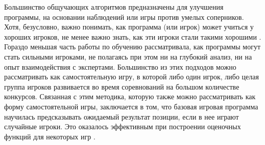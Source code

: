 Большинство общучающих алгоритмов предназначены для улучшения программы,
на основании наблюдений или игры против умелых соперников. Хотя,
безусловно, важно понимать, как программа (или игрок) может учиться у
хороших игроков, не менее важно знать, как эти игроки стали такими
хорошими . Гораздо меньшая часть работы по обучению рассматривала, как
программы могут стать сильными игроками, не полагаясь при этом ни на
глубокий анализ, ни на опыт взаимодействия с экспертами. Большинство из
этих подходов можно рассматривать как самостоятельную игру, в которой
либо один игрок, либо целая группа игроков развивается во время
соревнований на большом количестве конкурсов. Связанная с этим методика,
которую также можно рассматривать как форму самостоятельной игры,
заключается в том, что базовая игровая программа научилась предсказывать
ожидаемый результат позиции, если в нее играют случайные игроки. Это
оказалось эффективным при построении оценочных функций для некоторых игр
\cite{Pell:1993}.

